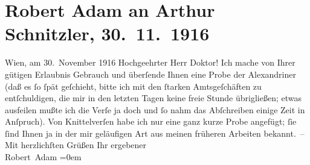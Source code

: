 

         \renewcommand{\erwaehnteOrte}{Orte: Wien}
         \renewcommand{\erwaehnteWerke}{}
               \section[Robert Adam an Arthur Schnitzler, 30. 11. 1916]{ Robert Adam an Arthur Schnitzler, 30. 11. 1916}\nopagebreak{}\rehead{ }\begin{ledgroupsized}[t]{13cm}\normalsize\beginnumbering \toendnotes[C]{\smallbreak\pagebreak[2]} 
\pstart
           \raggedleft{}{\pb}Wien, am 30. November 1916\pend
           \pstart{}Hochgeehrter Herr Doktor!\pend\pstart
           Ich mache von Ihrer gütigen Erlaubnis Gebrauch und überſende Ihnen eine Probe der
                    Alexandriner (daß es ſo ſpät geſchieht, bitte ich mit den ſtarken Amtsgeſchäften
                    zu entſchuldigen, die mir in den letzten Tagen keine freie Stunde übrigließen;
                    etwas ausfeilen mußte ich die Verſe ja doch und ſo nahm das Abſchreiben einige
                    Zeit in Anſpruch). Von Knittelverſen habe ich nur eine ganz kurze Probe
                    angefügt; ſie ſind Ihnen ja in der mir geläufi{\pb}gen Art aus meinen früheren Arbeiten bekannt. –\pend
           \pstart
           Mit herzlichſten Grüßen Ihr\pend
           \pstart
           ergebener{\\[\baselineskip]}\spacefill\mbox{Robert Adam}\pend
           \leftskip=0em{}
         
         \endnumbering{}\end{ledgroupsized}  \newcommand{\dateiname}{L02248}\newcommand{\titel}{Robert Adam an Arthur Schnitzler, 30. 11. 1916}\newcommand{\editorInnen}{Martin Anton Müller und Gerd-Hermann Susen}
      